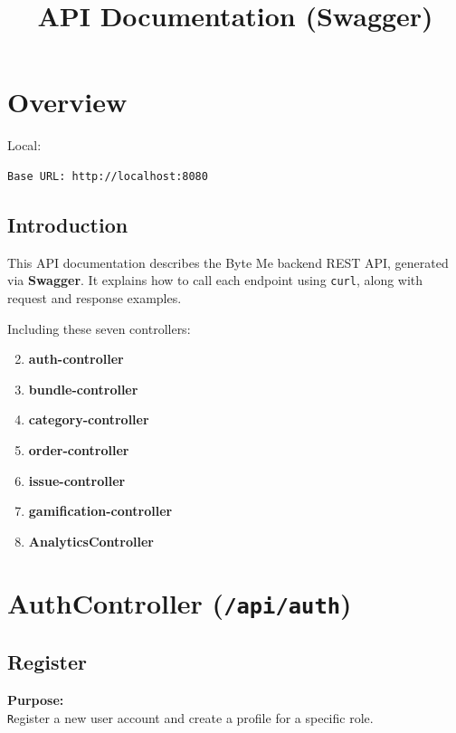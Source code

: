 \documentclass[a4paper,11pt]{article}
\title{API Documentation (Swagger)}
\begin{document}
\maketitle

\section{Overview}

Local:
\begin{lstlisting}
Base URL: http://localhost:8080
\end{lstlisting}

\subsection*{Introduction}

This API documentation describes the Byte Me backend REST API, generated via \textbf{Swagger}. It explains how to call each endpoint using \texttt{curl}, along with request and response examples.

Including these seven controllers:


\begin{enumerate}
    \setcounter{enumi}{1}
    \item \textbf{auth-controller}
    \item \textbf{bundle-controller}
    \item \textbf{category-controller}
    \item \textbf{order-controller}
    \item \textbf{issue-controller}
    \item \textbf{gamification-controller}
    \item \textbf{AnalyticsController}
\end{enumerate}






\section{ AuthController (\texttt{/api/auth})}

\subsection{Register}
\textbf{Purpose:} \\ \texttt Register a new user account and create a profile for a specific role. \\
\end{document}
